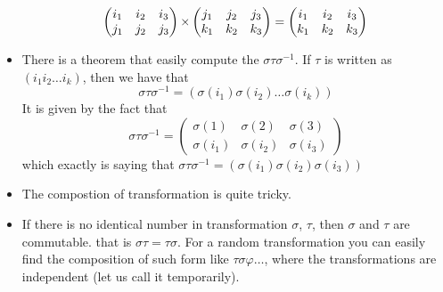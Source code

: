 \documentclass[../main.tex]{subfiles}
\begin{document}
\begin{itemize}
\[\begin{pmatrix}
	i_{1} & i_{2} & i_{3} \\ 
	j_1 & j_2 & j_3 
\end{pmatrix}
		{\large \times}
\begin{pmatrix}
	j_1 & j_2 & j_3 \\
	k_1 & k_2 & k_3 
\end{pmatrix} 
= 
\begin{pmatrix}
	i_{1} & i_{2} & i_{3} \\ 
	k_1 & k_2 & k_3 
\end{pmatrix} 
\]
\item There is a theorem that easily compute the \(\sigma\tau\sigma ^{-1}\). 
	If \(\tau\) is written as \( (i_{1} i_2 \dots i_{k})\), then we have that
		\[
			\sigma\tau\sigma ^{-1} =  (\sigma (i_{1}) \sigma (i_{2})\dots\sigma (i_{k}))
		\]
	It is given by the fact that 
	\[
	\sigma\tau\sigma ^{-1} =  
	\begin{pmatrix}
		\sigma (1) &\sigma (2) &\sigma (3) \\
	\sigma (i_{1}) &\sigma (i_{2}) & \sigma (i_{3 }) %
	\end{pmatrix}
	\]
	which exactly is saying that \(\sigma\tau\sigma ^{-1} = (\sigma (i_{1})\sigma (i_{2})\sigma(i_{3}))\)
	\item The compostion of transformation is quite tricky. 
	\item If there is no identical number in transformation \(\sigma\), \(\tau\), then \(\sigma\) and \(\tau\) are commutable. 
		that is \(\sigma\tau =\tau\sigma\).
		For a random transformation you can easily find the composition of such form like \(\tau\sigma \varphi \dots \), where the transformations are independent (let us call it temporarily).
\end{itemize}
\end{document}
